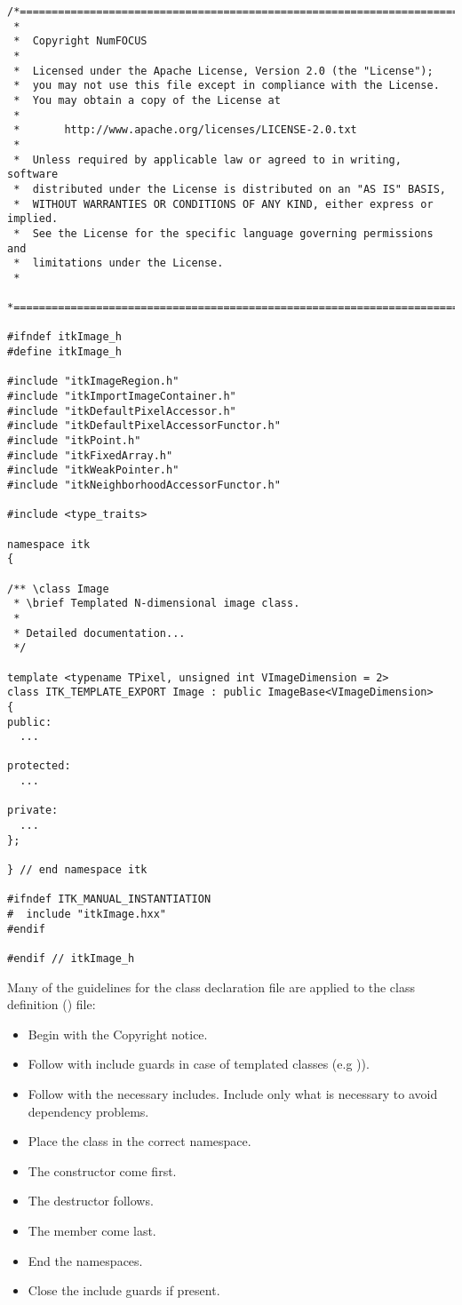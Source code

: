 \small
\begin{verbatim}
/*=========================================================================
 *
 *  Copyright NumFOCUS
 *
 *  Licensed under the Apache License, Version 2.0 (the "License");
 *  you may not use this file except in compliance with the License.
 *  You may obtain a copy of the License at
 *
 *       http://www.apache.org/licenses/LICENSE-2.0.txt
 *
 *  Unless required by applicable law or agreed to in writing, software
 *  distributed under the License is distributed on an "AS IS" BASIS,
 *  WITHOUT WARRANTIES OR CONDITIONS OF ANY KIND, either express or implied.
 *  See the License for the specific language governing permissions and
 *  limitations under the License.
 *
 *=========================================================================*/

#ifndef itkImage_h
#define itkImage_h

#include "itkImageRegion.h"
#include "itkImportImageContainer.h"
#include "itkDefaultPixelAccessor.h"
#include "itkDefaultPixelAccessorFunctor.h"
#include "itkPoint.h"
#include "itkFixedArray.h"
#include "itkWeakPointer.h"
#include "itkNeighborhoodAccessorFunctor.h"

#include <type_traits>

namespace itk
{

/** \class Image
 * \brief Templated N-dimensional image class.
 *
 * Detailed documentation...
 */

template <typename TPixel, unsigned int VImageDimension = 2>
class ITK_TEMPLATE_EXPORT Image : public ImageBase<VImageDimension>
{
public:
  ...

protected:
  ...

private:
  ...
};

} // end namespace itk

#ifndef ITK_MANUAL_INSTANTIATION
#  include "itkImage.hxx"
#endif

#endif // itkImage_h
\end{verbatim}
\normalsize

Many of the guidelines for the class declaration file are applied to the class
definition () file:
\begin{itemize}
\item Begin with the Copyright notice.
\item Follow with include guards in case of templated classes (e.g
)).
\item Follow with the necessary includes. Include only what is necessary to
avoid dependency problems.
\item Place the class in the correct namespace.
\item The constructor come first.
\item The destructor follows.
\item The  member come last.
\item End the namespaces.
\item Close the include guards if present.
\end{itemize}

